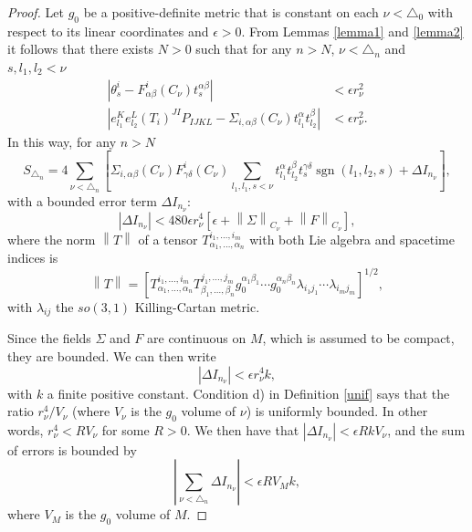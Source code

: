 \documentclass{article}
\DeclareMathOperator{\sgn}{sgn}
\begin{document}
\begin{proof}
	Let 
	$g_0$ be a positive-definite metric that is constant on each $\nu<\triangle_0$ with respect to its linear coordinates and $\epsilon>0$. From Lemmas \ref{lemma1} and \ref{lemma2} it follows that there exists $N>0$ such that for any $n>N$, $\nu<\triangle_{n}$ and $s, l_1, l_2 < \nu$ 
	\begin{align}
		\left|\theta_{s}^{i}-F_{\alpha\beta}^{i}(C_{\nu})t_{s}^{\alpha \beta}\right|&<\epsilon r_{\nu}^{2}\\
		\left|e_{l_1}^{K}e_{l_2}^{L}\left(T_{i}\right)^{JI}P_{IJKL}-\Sigma_{i,\alpha\beta}(C_{\nu})t_{l_1}^{\alpha}t_{l_2}^{\beta}\right|&<\epsilon r_{\nu}^{2}.
	\end{align}	
	In this way, for any $n>N$ 
	\begin{equation}\label{ev}
		S_{\triangle_n}=4\sum_{\nu<\triangle_n}\left[\Sigma_{i,\alpha\beta}(C_{\nu})F_{\gamma\delta}^{i}(C_{\nu})
		\sum_{l_1,l_1,s<\nu}t_{l_1}^{\alpha}t_{l_2}^{\beta}t_{s}^{\gamma \delta}\sgn(l_1, l_2, s)+\Delta I_{n_{\nu}}\right],
	\end{equation}	
	with a bounded error term $\Delta I_{n_{\nu}}$: 
	\begin{equation}\label{bound}
		\left|\Delta I_{n_{\nu}}\right|<480\epsilon r_{\nu}^{4}\left[\epsilon+\left\|\Sigma\right\|_{C_\nu}+\left\|F\right\|_{C_\nu}\right],
	\end{equation}	
	where the norm $\left\|T\right\|$ of a tensor $T_{\alpha_1,\dots,\alpha_n}^{i_1,\dots,i_m}$ with both Lie algebra and spacetime indices is 
	\begin{equation}\label{norm}
		\left\|T\right\|=\left[T_{\alpha_1,\dots,\alpha_n}^{i_1,\dots,i_m}T_{\beta_1,\dots,\beta_n}^{j_1,\dots,j_m}g_{0}^{\alpha_1\beta_1}\cdots g_{0}^{\alpha_n\beta_n}\lambda_{i_1j_1}\cdots\lambda_{i_mj_m}\right]^{1/2},
	\end{equation}	
	with $\lambda_{ij}$ the $so(3,1)$ Killing-Cartan metric.

Since the fields $\Sigma$ and $F$ are continuous on $M$, which is assumed to be compact, they are bounded. We can then write
	\begin{equation}\label{bound2}
		\left|\Delta I_{n_{\nu}}\right|<\epsilon r_{\nu}^{4}k,
	\end{equation}
	with $k$ a finite positive constant. Condition d) in Definition \ref{unif} says that the ratio $r_{\nu}^{4}/V_{\nu}$ (where $V_{\nu}$ is the $g_0$ volume of $\nu$) is uniformly bounded. In other words, $r_{\nu}^{4}<RV_{\nu}$ for some $R>0$. We then have that $\left|\Delta I_{n_{\nu}}\right|<\epsilon RkV_{\nu}$, and the sum of errors is bounded by
	\begin{equation}\label{bound3}
		\left|\sum_{\nu<\triangle_n}\Delta I_{n_{\nu}}\right|<\epsilon RV_{M}k,
	\end{equation}
	where $V_{M}$ is the $g_0$ volume of $M$. 
	

\end{proof}
\end{document}
